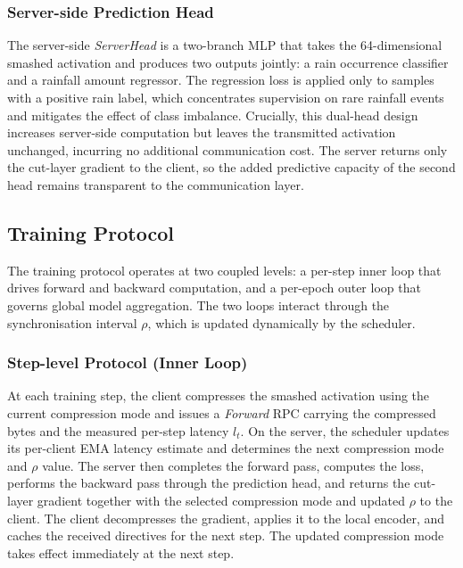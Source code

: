 \documentclass[conference]{IEEEtran}
\begin{document}
\subsubsection{Server-side Prediction Head}
The server-side \textit{ServerHead} is a two-branch MLP that takes the 64-dimensional smashed activation and produces two outputs jointly: a rain occurrence classifier and a rainfall amount regressor. The regression loss is applied only to samples with a positive rain label, which concentrates supervision on rare rainfall events and mitigates the effect of class imbalance. Crucially, this dual-head design increases server-side computation but leaves the transmitted activation unchanged, incurring no additional communication cost. The server returns only the cut-layer gradient to the client, so the added predictive capacity of the second head remains transparent to the communication layer.

\subsection{Training Protocol}
\label{subsec:protocol}

The training protocol operates at two coupled levels: a per-step inner loop that drives forward and backward computation, and a per-epoch outer loop that governs global model aggregation. The two loops interact through the synchronisation interval $\rho$, which is updated dynamically by the scheduler.

\subsubsection{Step-level Protocol (Inner Loop)}
At each training step, the client compresses the smashed activation using the current compression mode and issues a \textit{Forward} RPC carrying the compressed bytes and the measured per-step latency $l_t$. On the server, the scheduler updates its per-client EMA latency estimate and determines the next compression mode and $\rho$ value. The server then completes the forward pass, computes the loss, performs the backward pass through the prediction head, and returns the cut-layer gradient together with the selected compression mode and updated $\rho$ to the client. The client decompresses the gradient, applies it to the local encoder, and caches the received directives for the next step. The updated compression mode takes effect immediately at the next step.
\end{document}
